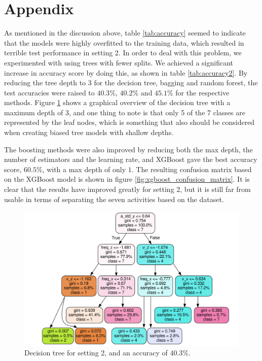 \section{Appendix}\label{sec:Appendix}

As mentioned in the discussion above, table \ref{tab:accuracy} seemed to indicate that the models were highly overfitted to the training data, which resulted in terrible test performance in setting 2. In order to deal with this problem, we experimented with using trees with fewer splits. We achieved a significant increase in accuracy score by doing this, as shown in table \ref{tab:accuracy2}. By reducing the tree depth to 3 for the decision tree, bagging and random forest, the test accuracies were raised to $40.3\%$, $40.2\%$ and $45.1\%$ for the respective methods. Figure \ref{fig:decisiontree} shows a graphical overview of the decision tree with a maximum depth of 3, and one thing to note is that only 5 of the 7 classes are represented by the leaf nodes, which is something that also should be considered when creating biased tree models with shallow depths.

The boosting methods were also improved by reducing both the max depth, the number of estimators and the learning rate, and XGBoost gave the best accuracy score, $60.5\%$, with a max depth of only $1$. The resulting confusion matrix based on the XGBoost model is shown in figure \ref{fig:xgboost_confusion_matrix}. It is clear that the results have improved greatly for setting 2, but it is still far from usable in terms of separating the seven activities based on the dataset. 

\begin{figure}
    \centering
    \includegraphics[scale=0.58]{Figures/activity_tree.pdf}
    \caption{Decision tree for setting 2, and an accuracy of $40.3\%$.}
    \label{fig:decisiontree}
\end{figure}

